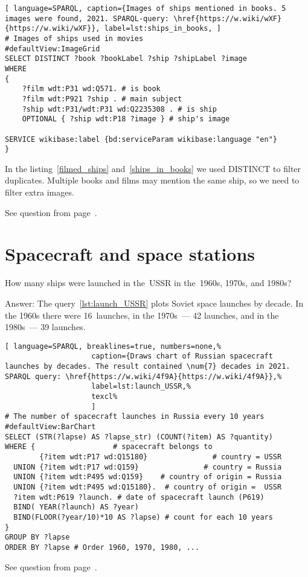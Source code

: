\begin{lstlisting}[ language=SPARQL, caption={Images of ships mentioned in books. 5 images were found, 2021. SPARQL-query: \href{https://w.wiki/wXF}{https://w.wiki/wXF}}, label=lst:ships_in_books, ]
# Images of ships used in movies
#defaultView:ImageGrid
SELECT DISTINCT ?book ?bookLabel ?ship ?shipLabel ?image
WHERE
{
	?film wdt:P31 wd:Q571. # is book	
	?film wdt:P921 ?ship . # main subject
	?ship wdt:P31/wdt:P31 wd:Q2235308 . # is ship
	OPTIONAL { ?ship wdt:P18 ?image } # ship's image
										
SERVICE wikibase:label {bd:serviceParam wikibase:language "en"}
}
\end{lstlisting}

In the listing~\ref{filmed_ships} and~\ref{ships_in_books} we used DISTINCT to filter duplicates. Multiple books and films may mention the same ship, so we need to filter extra images.

\small{See question from page~\pageref{question:ship_3}.}


\section{Spacecraft and space stations}
\label{answer:launches_USSR}
\begin{exercise}
	How many ships were launched in the~USSR in the~1960s, 1970s, and 1980s?
\end{exercise}
Answer: The query~\ref{lst:launch_USSR} plots Soviet space launches by decade. In the 1960s there were 16~launches, in the 1970s~--- 42 launches, and in the 1980s~--- 39 launches.
\begin{lstlisting}[ language=SPARQL, breaklines=true, numbers=none,%
                    caption={Draws chart of Russian spacecraft launches by decades. The result contained \num{7} decades in 2021. SPARQL query: \href{https://w.wiki/4f9A}{https://w.wiki/4f9A}},%
                    label=lst:launch_USSR,%
                    texcl%
                    ]
# The number of spacecraft launches in Russia every 10 years
#defaultView:BarChart
SELECT (STR(?lapse) AS ?lapse_str) (COUNT(?item) AS ?quantity)
WHERE {                  # spacecraft belongs to
        {?item wdt:P17 wd:Q15180}               # country = USSR
  UNION {?item wdt:P17 wd:Q159}               # country = Russia
  UNION {?item wdt:P495 wd:Q159}    # country of origin = Russia
  UNION {?item wdt:P495 wd:Q15180}.  # country of origin =  USSR
  ?item wdt:P619 ?launch. # date of spacecraft launch (P619)
  BIND( YEAR(?launch) AS ?year) 
  BIND(FLOOR(?year/10)*10 AS ?lapse) # count for each 10 years
} 
GROUP BY ?lapse
ORDER BY ?lapse # Order 1960, 1970, 1980, ...
\end{lstlisting}%
\small{See question from page~\pageref{question:spacecraft_1}.}

